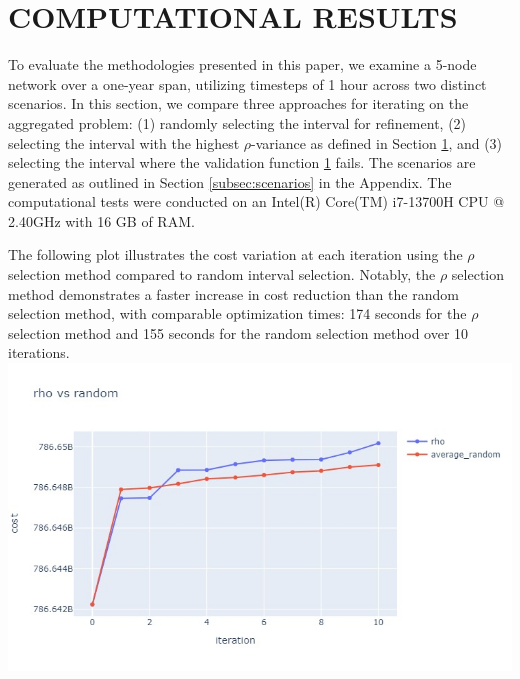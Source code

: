 \section{COMPUTATIONAL RESULTS}

To evaluate the methodologies presented in this paper, we examine a  5-node network over a one-year span, utilizing timesteps of 1 hour across two distinct scenarios.
 In this section, we compare three approaches for iterating on the aggregated problem: (1) randomly selecting the interval for refinement, (2) selecting the interval with the highest \(\rho\)-variance as defined in Section \ref{}, and (3) selecting the interval where the validation function \ref{} fails. The scenarios are generated as outlined in Section \ref{subsec:scenarios} in the Appendix. The computational tests were conducted on an Intel(R) Core(TM) i7-13700H CPU @ 2.40GHz with 16 GB of RAM.

The following plot illustrates the cost variation at each iteration using the \(\rho\) selection method compared to random interval selection. Notably, the \(\rho\) selection method demonstrates a faster increase in cost reduction than the random selection method, with comparable optimization times: 174 seconds for the \(\rho\) selection method and 155 seconds for the random selection method over 10 iterations.
\includegraphics[width=1.1\textwidth]{images/rho_vas_average2.png}

